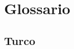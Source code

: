 \chapter{Glossario}

\label{apx:glossario}

\begin{footnotesize}

\novocalize

\section{Turco}

\label{sec:glossarioturco}


\end{footnotesize}
